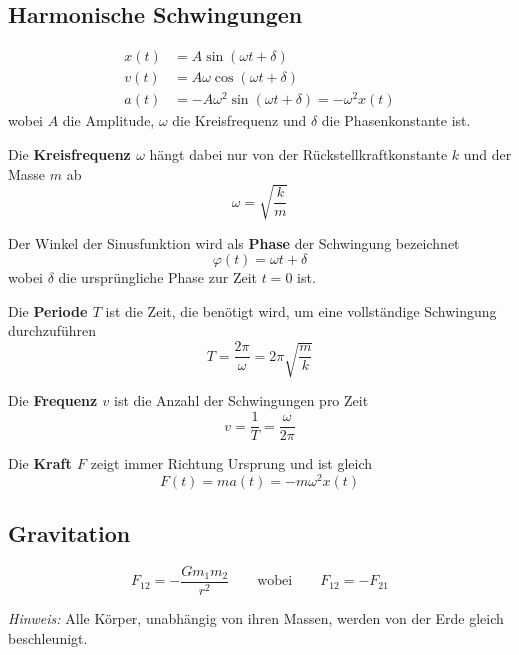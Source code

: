 \documentclass[7pt]{article}
\begin{document}
\begin{multicols*}{3}
\subsection{Harmonische Schwingungen}

\begin{equation*}
\begin{split}
	x(t) & = A\sin(\omega t+\delta)\\
	v(t) & = A\omega\cos(\omega t + \delta)\\
	a(t) & = -A\omega^2\sin(\omega t+\delta) = -\omega^2x(t)
\end{split}
\end{equation*}
wobei $A$ die Amplitude, $\omega$ die Kreisfrequenz und $\delta$ die Phasenkonstante ist.
\newline

Die \textbf{Kreisfrequenz $\omega$} h{\"a}ngt dabei nur von der R{\"u}ckstellkraftkonstante $k$ und der Masse $m$ ab
\begin{equation*}
	\omega = \sqrt{\frac{k}{m}}
\end{equation*}

Der Winkel der Sinusfunktion wird als \textbf{Phase} der Schwingung bezeichnet
\begin{equation*}
	\varphi(t) = \omega t + \delta
\end{equation*}
wobei $\delta$ die urspr{\"u}ngliche Phase zur Zeit $t = 0$ ist. \newline

Die \textbf{Periode $T$} ist die Zeit, die ben{\"o}tigt wird, um eine vollst{\"a}ndige Schwingung durchzuf{\"u}hren
\begin{equation*}
	T = \frac{2\pi}{\omega} = 2\pi\sqrt{\frac{m}{k}}
\end{equation*} 

Die \textbf{Frequenz $v$} ist die Anzahl der Schwingungen pro Zeit
\begin{equation*}
	v = \frac{1}{T} = \frac{\omega}{2\pi}
\end{equation*}

Die \textbf{Kraft $F$} zeigt immer Richtung Ursprung und ist gleich
\begin{equation*}
	F(t) = ma(t) = -m\omega^2x(t)
\end{equation*}

\subsection{Gravitation}

\begin{equation*}
	F_{12} = -\frac{Gm_1m_2}{r^2}\qquad\text{wobei}\qquad F_{12} = -F_{21}
\end{equation*}

\emph{Hinweis:} Alle K{\"o}rper, unabh{\"a}ngig von ihren Massen, werden von der Erde gleich beschleunigt.

\end{multicols*}
\end{document}
